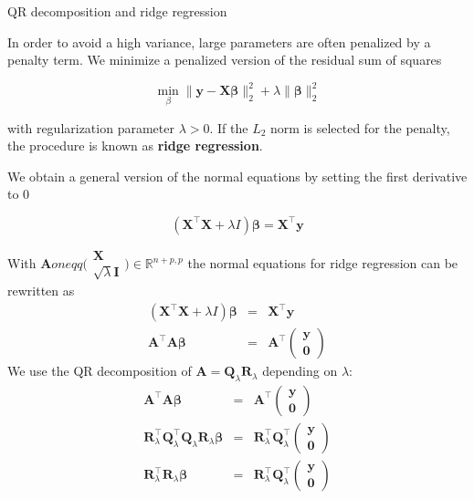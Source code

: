 \documentclass[11pt,compress,t,notes=noshow, xcolor=table]{beamer}
\begin{document}
\begin{vbframe}{QR decomposition and ridge regression}

In order to avoid a high variance, large parameters are often penalized by a penalty term. We minimize a penalized version of the residual sum of squares

$$
\min_\beta \|\bm{y} - \bm{X\beta}\|_2^2 + \lambda \|\bm{\beta}\|_2^2
$$

with regularization parameter $\lambda > 0$. If the $L_2$ norm is selected for the penalty, the procedure is known as \textbf{ridge regression}.

\lz

We obtain a general version of the normal equations by setting the first derivative to $0$ 

$$
\left(\mathbf{X}^\top\mathbf{X} + \lambda I \right)\boldsymbol{\beta} = \mathbf{X}^\top\mathbf{y}
$$

\framebreak

With $\bm{A} oneqq \bigl( \begin{smallmatrix} \bm{X} \\ \sqrt{\lambda} \bm{I} \end{smallmatrix} \bigr) \in \mathbb{R}^{n+p,p} $  the normal equations for ridge regression can be rewritten as
\begin{eqnarray*}
\left(\mathbf{X}^\top\mathbf{X} + \lambda I \right)\boldsymbol{\beta} &=& \mathbf{X}^\top\mathbf{y} \\
\mathbf{A}^\top\mathbf{A}\boldsymbol{\beta} &=& \mathbf{A}^\top\begin{pmatrix} \mathbf{y} \\ \mathbf{0} \end{pmatrix}
\end{eqnarray*}
We use the QR decomposition of $ \bm{A} = \bm{Q}_\lambda\bm{R}_\lambda $ depending on $\lambda$:
\begin{eqnarray*}
\mathbf{A}^\top\mathbf{A}\boldsymbol{\beta} &=& \mathbf{A}^\top \begin{pmatrix} \mathbf{y} \\ \mathbf{0} \end{pmatrix} \\
\mathbf{R}_\lambda^\top \mathbf{Q}_\lambda^\top \mathbf{Q}_\lambda\mathbf{R}_\lambda\boldsymbol{\beta} &=& \mathbf{R}_\lambda^\top\mathbf{Q}_\lambda^\top \begin{pmatrix} \mathbf{y} \\ \mathbf{0} \end{pmatrix} \\
\mathbf{R}_\lambda^\top\mathbf{R}_\lambda\boldsymbol{\beta} &=& \mathbf{R}_\lambda^\top\mathbf{Q}_\lambda^\top \begin{pmatrix} \mathbf{y} \\ \mathbf{0} \end{pmatrix} 
\end{eqnarray*}


\end{vbframe}
\end{document}

